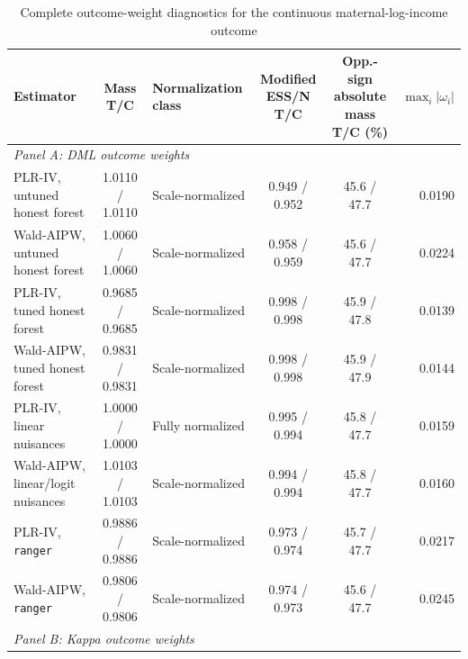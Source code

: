 \documentclass[12pt, a4paper, oneside]{article}
\theoremstyle{plain}
\theoremstyle{definition}
\begin{document}
\begin{table}[H]
\centering
\caption{Complete outcome-weight diagnostics for the continuous
maternal-log-income outcome}
\label{tab:child_weights_income_appendix}
\scriptsize
\setlength{\tabcolsep}{3pt}
\renewcommand{\arraystretch}{0.92}
\begin{threeparttable}
\begin{tabular}{@{}lclccr@{}}
\toprule
Estimator
& \shortstack{Mass\\T/C}
& Normalization class
& \shortstack{Modified ESS/N\\T/C}
& \shortstack{Opp.-sign absolute\\mass T/C (\%)}
& \(\max_i|\omega_i|\) \\
\midrule

\multicolumn{6}{l}{\textit{Panel A: DML outcome weights}} \\[2pt]

PLR-IV, untuned honest forest
& 1.0110 / 1.0110
& Scale-normalized
& 0.949 / 0.952
& 45.6 / 47.7
& 0.0190 \\

Wald-AIPW, untuned honest forest
& 1.0060 / 1.0060
& Scale-normalized
& 0.958 / 0.959
& 45.6 / 47.7
& 0.0224 \\

PLR-IV, tuned honest forest
& 0.9685 / 0.9685
& Scale-normalized
& 0.998 / 0.998
& 45.9 / 47.8
& 0.0139 \\

Wald-AIPW, tuned honest forest
& 0.9831 / 0.9831
& Scale-normalized
& 0.998 / 0.998
& 45.9 / 47.9
& 0.0144 \\

PLR-IV, linear nuisances
& 1.0000 / 1.0000
& Fully normalized
& 0.995 / 0.994
& 45.8 / 47.7
& 0.0159 \\

Wald-AIPW, linear/logit nuisances
& 1.0103 / 1.0103
& Scale-normalized
& 0.994 / 0.994
& 45.8 / 47.7
& 0.0160 \\

PLR-IV, \texttt{ranger}
& 0.9886 / 0.9886
& Scale-normalized
& 0.973 / 0.974
& 45.7 / 47.7
& 0.0217 \\

Wald-AIPW, \texttt{ranger}
& 0.9806 / 0.9806
& Scale-normalized
& 0.974 / 0.973
& 45.6 / 47.7
& 0.0245 \\[3pt]

\multicolumn{6}{l}{\textit{Panel B: Kappa outcome weights}} \\[2pt]


\end{tabular}
\end{threeparttable}
\end{table}
\end{document}
